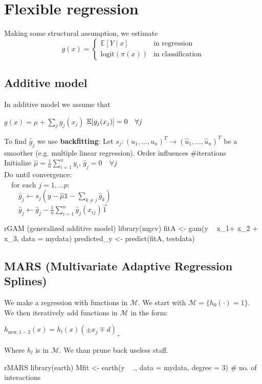 \section{Flexible regression}
Making some structural assumption, we estimate 
\begin{equation*}
    g(x)=\begin{cases}
    \mathbb{E}[Y\mid x]&\text{in regression}\\
    \text{logit}(\pi(x))&\text{in classification}
    \end{cases}
\end{equation*}
\subsection{Additive model}
In additive model we assume that \\
\begin{center}
    $g(x)=\mu +\sum_jg_j(x_j)$ {} {} {} {} {}    $\mathbb{E}[g_j(x_j)]=0\quad \forall j$\\
\end{center}
To find $\hat g_j$ we use \textbf{backfitting}:
Let $s_j: (u_1,...,u_n)^T \to (\hat u_1,...,\hat u_n)^T$ be a smoother (e.g. multiple linear regression). Order influences \#iterations\\
Initialize $\hat \mu = \frac 1 n \sum_{i=1}^n y_i$, \quad $\hat g_j = 0 \quad \forall j$\\
Do until convergence:\\
$\quad \text{for each } j=1,...p$:\\
$\quad \quad \hat g_j \gets s_j(y - \hat \mu \mathbb{1} - \sum_{k \neq j} \hat g_k)$\\
$\quad \quad \hat g_j \gets \hat g_j - \frac 1 n \sum_{i=1}^n \hat g_j(x_{ij}) \vec{1} $\\
\begin{codebox}{r}{GAM (generalized additive model)}
library(mgcv)
fitA <- gam(y ~ x_1+ x_2 + x_3, data = mydata)
predicted_y <- predict(fitA, testdata)
\end{codebox}

\subsection{MARS (Multivariate Adaptive Regression Splines)}
We make a regression with functions in $\mathcal{M}$. We start with $\mathcal{M}=\{h_0(\cdot)=1\}$. We then iteratively add functions in $\mathcal{M}$ in the form:
\begin{center}
$h_{\text{new},1-2}(x)=h_l(x)(\pm x_j\mp d)_+$
\end{center}
Where $h_l$ is in $\mathcal{M}$. We than prune back useless staff.
\begin{codebox}{r}{MARS}
library(earth)
Mfit <- earth(y ~ ., data = mydata, degree = 3) # no. of interactions
\end{codebox}
